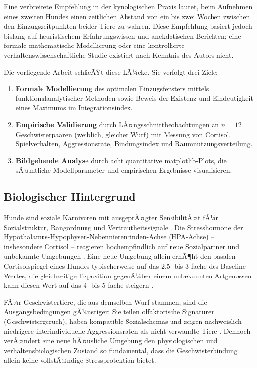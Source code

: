 ﻿\documentclass[12pt, a4paper]{article}
\theoremstyle{plain}
\theoremstyle{definition}
\theoremstyle{remark}
\begin{document}
Eine verbreitete Empfehlung in der kynologischen Praxis lautet, beim Aufnehmen
eines zweiten Hundes einen zeitlichen Abstand von ein bis zwei Wochen zwischen
den Einzugszeitpunkten beider Tiere zu wahren. Diese Empfehlung basiert jedoch
bislang auf heuristischem Erfahrungswissen und anekdotischen Berichten; eine
formale mathematische Modellierung oder eine kontrollierte verhaltenswissenschaftliche
Studie existiert nach Kenntnis des Autors nicht.

Die vorliegende Arbeit schlieÃŸt diese LÃ¼cke. Sie verfolgt drei Ziele:

\begin{enumerate}[leftmargin=*, label=(\roman*)]
  \item \textbf{Formale Modellierung} des optimalen Einzugsfensters mittels
    funktionalanalytischer Methoden sowie Beweis der Existenz und Eindeutigkeit
    eines Maximums im Integrationsindex.
  \item \textbf{Empirische Validierung} durch LÃ¤ngsschnittbeobachtungen an
    $n = 12$ Geschwisterpaaren (weiblich, gleicher Wurf) mit Messung von
    Cortisol, Spielverhalten, Aggressionsrate, Bindungsindex und
    Raumnutzungsverteilung.
  \item \textbf{Bildgebende Analyse} durch acht quantitative matplotlib-Plots,
    die sÃ¤mtliche Modellparameter und empirischen Ergebnisse visualisieren.
\end{enumerate}

\subsection{Biologischer Hintergrund}

Hunde sind soziale Karnivoren mit ausgeprÃ¤gter SensibilitÃ¤t fÃ¼r Sozialstruktur,
Rangordnung und Vertrautheitssignale \cite{miklosi2007dog}. Die
Stresshormone der Hypothalamus-Hypophysen-Nebennierenrinden-Achse
(HPA-Achse) -- insbesondere Cortisol -- reagieren hochempfindlich auf neue
Sozialpartner und unbekannte Umgebungen \cite{beerda1998behavioural}. Eine neue
Umgebung allein erhÃ¶ht den basalen Cortisolspiegel eines Hundes typischerweise
auf das 2{,}5- bis 3-fache des Baseline-Wertes; die gleichzeitige Exposition
gegenÃ¼ber einem unbekannten Artgenossen kann diesen Wert auf das 4- bis
5-fache steigern \cite{hennessy1997plasma}.

FÃ¼r Geschwistertiere, die aus demselben Wurf stammen, sind die
Ausgangsbedingungen gÃ¼nstiger: Sie teilen olfaktorische Signaturen
(Geschwistergeruch), haben kompatible Sozialschemas und zeigen nachweislich
niedrigere interindividuelle Aggressionsraten als nicht-verwandte Tiere
\cite{pal2005pup}. Dennoch verÃ¤ndert eine neue hÃ¤usliche Umgebung den
physiologischen und verhaltensbiologischen Zustand so fundamental, dass die
Geschwisterbindung allein keine vollstÃ¤ndige Stressprotektion bietet.
\end{document}
